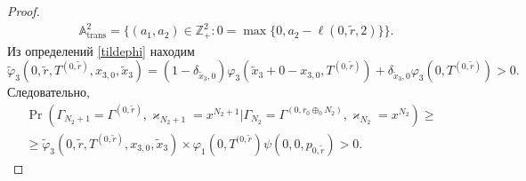 \documentclass[a4paper,12pt,russian]{extarticle}
\begin{document}
\begin{proof}
\begin{align*}
 &{\mathbb A}_{\mathrm{trans}}^2= \{(a_1,a_2) \in \mathbb{Z}_+^2 \colon  0=\max{\{0,a_2-\ell(0,\tilde{r},2)\}}\}.
\end{align*}
Из определений \eqref{tildephi} находим
\begin{equation*}
\widetilde{\varphi}_3(0,\tilde{r},T^{(0,\tilde{r})},x_{3,0},\tilde{x}_3)= (1-\delta_{\tilde{x}_3,0}) \varphi_3(\tilde{x}_3 + 0 - x_{3,0},T^{(0,\tilde{r})} ) + \delta_{\tilde{x}_3,0} \varphi_3(0,T^{(0,\tilde{r})}) > 0.
\end{equation*}
Следовательно, 
\begin{multline*}
\Pr (\Gamma_{N_2+1}=\Gamma^{(0,\tilde{r})},\varkappa_{N_2+1}=x^{N_2+1} | \Gamma_{N_2}=\Gamma^{(0,r_0\oplus_{0}N_2)},\varkappa_{N_2}=x^{N_2})\geqslant\\
\geqslant \widetilde{\varphi}_3(0,\tilde{r},T^{(0,\tilde{r})},x_{3,0},\tilde{x}_3)
\times
\varphi_1(0,T^{(0,\tilde{r}}) \psi(0,0, p_{0,\tilde{r}}) > 0.
\end{multline*}


\end{proof}
\end{document}
